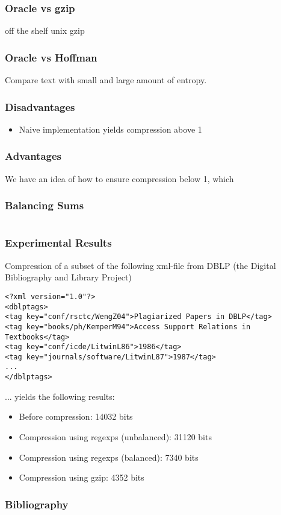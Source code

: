 \documentclass[slidestop,compress,mathserif, xcolor=table]{beamer}
\begin{document}
\begin{frame}
  \frametitle{Oracle vs gzip}
  
  off the shelf unix gzip
\end{frame}

\begin{frame}
  \frametitle{Oracle vs Hoffman}
  Compare text with small and large amount of entropy.
\end{frame}

\begin{frame}
  \frametitle{Disadvantages}

  \begin{itemize}
  \item Naive implementation\cite{heni2010} yields compression above 1
  \end{itemize}

\end{frame}

\begin{frame}
  \frametitle{Advantages}

  We have an idea of how to ensure compression below 1, which
\end{frame}

\begin{frame}[fragile]
  \frametitle{Balancing Sums}
 
{\tiny
\begin{verbatim}

\end{verbatim}
} 
  

\end{frame}

\begin{frame}[fragile]
  \frametitle{Experimental Results}

  Compression of a subset of the following xml-file from DBLP (the Digital Bibliography and Library Project)

{\tiny
\begin{verbatim}
<?xml version="1.0"?>
<dblptags>
<tag key="conf/rsctc/WengZ04">Plagiarized Papers in DBLP</tag>
<tag key="books/ph/KemperM94">Access Support Relations in Textbooks</tag>
<tag key="conf/icde/LitwinL86">1986</tag>
<tag key="journals/software/LitwinL87">1987</tag>
...
</dblptags>
\end{verbatim}
} 

  ... yields the following results:

  \begin{itemize}
  \item Before compression: 14032 bits
  \item Compression using regexps (unbalanced): 31120 bits
  \item Compression using regexps (balanced): 7340 bits
  \item Compression using gzip: 4352 bits
  \end{itemize}

\end{frame}


\begin{frame}
  \frametitle{Bibliography}
  
  
  
  
\end{frame}
\end{document}
